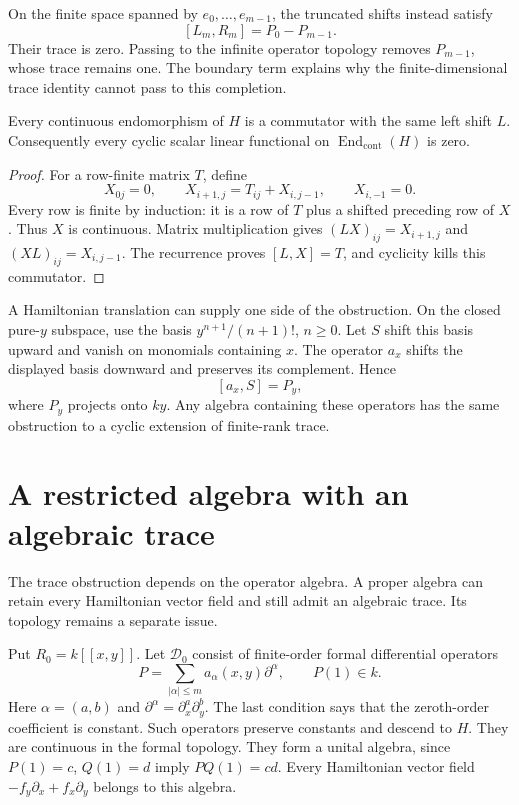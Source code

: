 On the finite space spanned by $e_0,\ldots,e_{m-1}$, the truncated
shifts instead satisfy
\[
 [L_m,R_m]=P_0-P_{m-1}.
\]
Their trace is zero. Passing to the infinite operator topology removes
$P_{m-1}$, whose trace remains one. The boundary term explains why
the finite-dimensional trace identity cannot pass to this completion.

\begin{proposition}
Every continuous endomorphism of $H$ is a commutator with the same
left shift $L$. Consequently every cyclic scalar linear functional
on $\operatorname{End}_{\mathrm{cont}}(H)$ is zero.
\end{proposition}
\begin{proof}
For a row-finite matrix $T$, define
\[
 X_{0j}=0,\qquad X_{i+1,j}=T_{ij}+X_{i,j-1},\qquad X_{i,-1}=0.
\]
Every row is finite by induction: it is a row of $T$ plus a shifted
preceding row of $X$. Thus $X$ is continuous. Matrix multiplication gives
$(LX)_{ij}=X_{i+1,j}$ and $(XL)_{ij}=X_{i,j-1}$.
The recurrence proves $[L,X]=T$, and cyclicity kills this commutator.
\end{proof}

A Hamiltonian translation can supply one side of the obstruction.
On the closed pure-$y$ subspace, use the basis
$y^{n+1}/(n+1)!$, $n\geq0$. Let $S$ shift this basis upward and
vanish on monomials containing $x$. The operator $a_x$ shifts the
displayed basis downward and preserves its complement. Hence
\[
 [a_x,S]=P_y,
\]
where $P_y$ projects onto $ky$. Any algebra containing these operators
has the same obstruction to a cyclic extension of finite-rank trace.

\section{A restricted algebra with an algebraic trace}

The trace obstruction depends on the operator algebra. A proper algebra
can retain every Hamiltonian vector field and still admit an algebraic
trace. Its topology remains a separate issue.

Put $R_0=k[[x,y]]$. Let $\mathcal D_0$ consist of finite-order
formal differential operators
\[
 P=\sum_{|\alpha|\leq m}a_\alpha(x,y)\partial^\alpha,
 \qquad P(1)\in k.
\]
Here $\alpha=(a,b)$ and $\partial^\alpha=\partial_x^a\partial_y^b$.
The last condition says that the zeroth-order coefficient is constant.
Such operators preserve constants and descend to $H$. They are continuous
in the formal topology. They form a unital algebra, since
$P(1)=c$, $Q(1)=d$ imply $PQ(1)=cd$.
Every Hamiltonian vector field $-f_y\partial_x+f_x\partial_y$ belongs
to this algebra.

